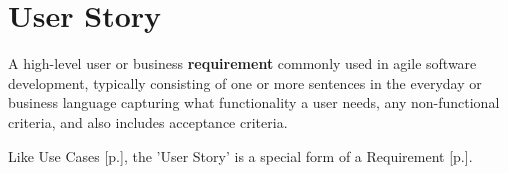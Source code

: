 \section{User Story}
\label{sec:User Story}

A high-level user or business \textbf{requirement} commonly used in agile software development, typically consisting of one or more sentences in the everyday or business language capturing what functionality a user needs, any non-functional criteria, and also includes acceptance criteria.

Like Use Cases [p.\pageref{sec:Use Case}], the 'User Story' is a special form of a Requirement [p.\pageref{sec:Requirement}].

